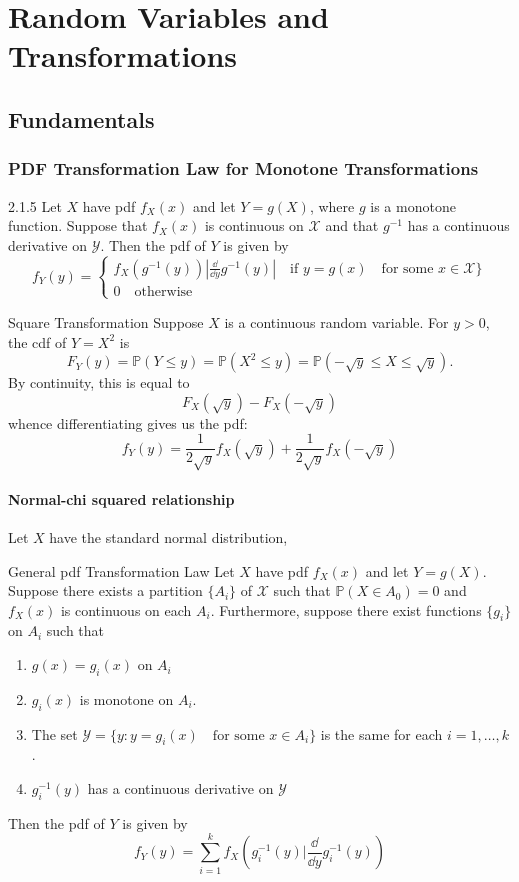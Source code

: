 \documentclass[../main]{subfiles}
\begin{document}
\chapter{Random Variables and Transformations}
\section{Fundamentals}
\subsection{PDF Transformation Law for Monotone Transformations}
\begin{bbox}{2.1.5}
    Let $X$ have pdf $f_X(x)$ and let $Y=g(X)$, where $g$ is a monotone function. Suppose that $f_X(x)$ is continuous on $\mathcal X$ and that $g^{-1}$ has a continuous derivative on $\mathcal Y$. Then the pdf of $Y$ is given by 
    \[
    f_Y(y) = \begin{cases}
        f_X(g^{-1}(y))|\frac{\dd}{\dd y}g^{-1}(y)|\quad \text{if $y=g(x) \quad \text{for some $x\in \mathcal X$}\}$}\\
        0 \quad \text{otherwise}
    \end{cases}
    \]
\end{bbox}
\begin{pbox}{Square Transformation}
    Suppose $X$ is a continuous random variable. For $y>0$, the cdf of $Y=X^2$ is 
    \[
    F_Y(y) = \mathbb P(Y\le y) = \mathbb P(X^2 \le y) = \mathbb P(-\sqrt{y}\le X \le \sqrt{y}).
    \]
    By continuity, this is equal to 
    \[
    F_X(\sqrt{y}) - F_X(-\sqrt{y})
    \]
    whence differentiating gives us the pdf:
    \[
    f_Y(y) = \frac{1}{2\sqrt{y}}f_X(\sqrt{y})+\frac{1}{2\sqrt{y}}f_X(-\sqrt{y})
    \]
\end{pbox}
\subsubsection{Normal-chi squared relationship}
Let $X$ have the standard normal distribution,
\begin{bbox}{General pdf Transformation Law}
    Let $X$ have pdf $f_X(x)$ and let $Y=g(X)$. Suppose there exists a partition $\{A_i\}$ of $\mathcal X$ such that $\mathbb P(X\in A_0) = 0$ and $f_X(x)$ is continuous on each $A_i$. Furthermore, suppose there exist functions $\{g_i\}$ on $A_i$ such that 
    \begin{enumerate}
        \item $g(x) = g_i(x)$ on $A_i$
        \item $g_i(x)$ is monotone on $A_i$.
        \item The set $\mathcal Y = \{y: y=g_i(x) \quad  \text{for some $x\in A_i$}\}$ is the same for each $i=1,\dots,k$.
        \item $g_i^{-1}(y)$ has a continuous derivative on $\mathcal Y$
    \end{enumerate}
    Then the pdf of $Y$ is given by 
    \[
    f_Y(y) = \sum_{i=1}^k f_X(g_i^{-1}(y)|\frac{\dd}{\dd y}g_i^{-1}(y))
    \]
\end{bbox}
\end{document}
